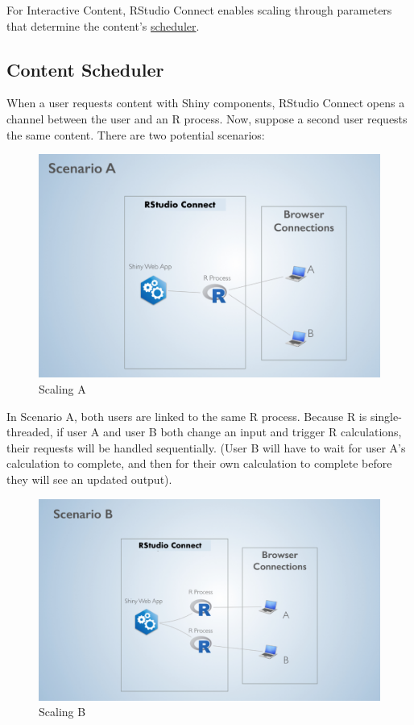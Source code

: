 \documentclass[]{book}
\theoremstyle{definition}
\theoremstyle{definition}
\theoremstyle{definition}
\theoremstyle{remark}
\begin{document}
For Interactive Content, RStudio Connect enables scaling through
parameters that determine the content's
\href{https://docs.rstudio.com/connect/admin/appendix-configuration.html\#appendix-configuration-scheduler}{scheduler}.

\hypertarget{content-scheduler}{%
\subsection{Content Scheduler}\label{content-scheduler}}

When a user requests content with Shiny components, RStudio Connect
opens a channel between the user and an R process. Now, suppose a second
user requests the same content. There are two potential scenarios:

\begin{figure}
\centering
\includegraphics{imgs/scaling/scaling-a.png}
\caption{Scaling A}
\end{figure}

In Scenario A, both users are linked to the same R process. Because R is
single-threaded, if user A and user B both change an input and trigger R
calculations, their requests will be handled sequentially. (User B will
have to wait for user A's calculation to complete, and then for their
own calculation to complete before they will see an updated output).

\begin{figure}
\centering
\includegraphics{imgs/scaling/scaling-b.png}
\caption{Scaling B}
\end{figure}
\end{document}
